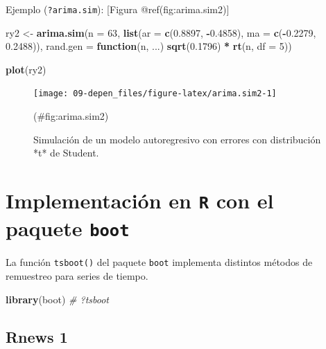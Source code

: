 \documentclass[]{book}
\newenvironment{Shaded}{\begin{snugshade}}{\end{snugshade}}
\newcommand{\KeywordTok}[1]{\textcolor[rgb]{0.13,0.29,0.53}{\textbf{#1}}}
\newcommand{\DataTypeTok}[1]{\textcolor[rgb]{0.13,0.29,0.53}{#1}}
\newcommand{\DecValTok}[1]{\textcolor[rgb]{0.00,0.00,0.81}{#1}}
\newcommand{\FloatTok}[1]{\textcolor[rgb]{0.00,0.00,0.81}{#1}}
\newcommand{\StringTok}[1]{\textcolor[rgb]{0.31,0.60,0.02}{#1}}
\newcommand{\CommentTok}[1]{\textcolor[rgb]{0.56,0.35,0.01}{\textit{#1}}}
\newcommand{\ControlFlowTok}[1]{\textcolor[rgb]{0.13,0.29,0.53}{\textbf{#1}}}
\newcommand{\OperatorTok}[1]{\textcolor[rgb]{0.81,0.36,0.00}{\textbf{#1}}}
\newcommand{\NormalTok}[1]{#1}
\theoremstyle{definition}
\theoremstyle{definition}
\theoremstyle{definition}
\theoremstyle{remark}
\begin{document}
Ejemplo (\texttt{?arima.sim}): {[}Figura @ref(fig:arima.sim2){]}

\begin{Shaded}
\begin{Highlighting}[]
\NormalTok{ry2 <-}\StringTok{ }\KeywordTok{arima.sim}\NormalTok{(}\DataTypeTok{n =} \DecValTok{63}\NormalTok{, }\KeywordTok{list}\NormalTok{(}\DataTypeTok{ar =} \KeywordTok{c}\NormalTok{(}\FloatTok{0.8897}\NormalTok{, }\OperatorTok{-}\FloatTok{0.4858}\NormalTok{), }
          \DataTypeTok{ma =} \KeywordTok{c}\NormalTok{(}\OperatorTok{-}\FloatTok{0.2279}\NormalTok{, }\FloatTok{0.2488}\NormalTok{)),}
          \DataTypeTok{rand.gen =} \ControlFlowTok{function}\NormalTok{(n, ...) }\KeywordTok{sqrt}\NormalTok{(}\FloatTok{0.1796}\NormalTok{) }\OperatorTok{*}\StringTok{ }\KeywordTok{rt}\NormalTok{(n, }\DataTypeTok{df =} \DecValTok{5}\NormalTok{))}

\KeywordTok{plot}\NormalTok{(ry2)}
\end{Highlighting}
\end{Shaded}

\begin{figure}[!htb]

{\centering \texttt{[image: 09-depen\_files/figure-latex/arima.sim2-1]} 

}

\caption{Simulación de un modelo autoregresivo con errores con distribución *t* de Student.}(\#fig:arima.sim2)
\end{figure}

\section{\texorpdfstring{Implementación en \texttt{R} con el paquete
\texttt{boot}}{Implementación en R con el paquete boot}}\label{implementacion-en-r-con-el-paquete-boot}

La función \texttt{tsboot()} del paquete \texttt{boot} implementa
distintos métodos de remuestreo para series de tiempo.

\begin{Shaded}
\begin{Highlighting}[]
\KeywordTok{library}\NormalTok{(boot)}
\CommentTok{# ?tsboot}
\end{Highlighting}
\end{Shaded}

\subsection{Rnews 1}\label{rnews-1}
\end{document}
